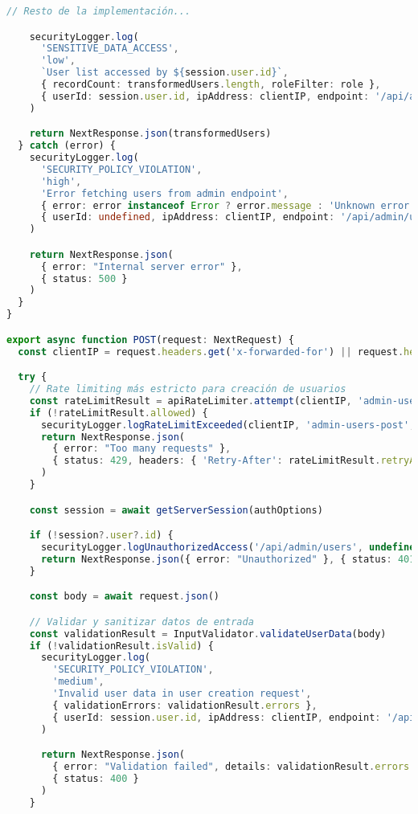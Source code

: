 \documentclass[12pt,a4paper]{article}
\begin{document}
\begin{lstlisting}[language=TypeScript, caption=API con Seguridad Integrada]
    // Resto de la implementación...

    securityLogger.log(
      'SENSITIVE_DATA_ACCESS',
      'low',
      `User list accessed by ${session.user.id}`,
      { recordCount: transformedUsers.length, roleFilter: role },
      { userId: session.user.id, ipAddress: clientIP, endpoint: '/api/admin/users' }
    )

    return NextResponse.json(transformedUsers)
  } catch (error) {
    securityLogger.log(
      'SECURITY_POLICY_VIOLATION',
      'high',
      'Error fetching users from admin endpoint',
      { error: error instanceof Error ? error.message : 'Unknown error' },
      { userId: undefined, ipAddress: clientIP, endpoint: '/api/admin/users' }
    )

    return NextResponse.json(
      { error: "Internal server error" },
      { status: 500 }
    )
  }
}

export async function POST(request: NextRequest) {
  const clientIP = request.headers.get('x-forwarded-for') || request.headers.get('x-real-ip') || 'unknown'

  try {
    // Rate limiting más estricto para creación de usuarios
    const rateLimitResult = apiRateLimiter.attempt(clientIP, 'admin-users-post')
    if (!rateLimitResult.allowed) {
      securityLogger.logRateLimitExceeded(clientIP, 'admin-users-post', clientIP)
      return NextResponse.json(
        { error: "Too many requests" },
        { status: 429, headers: { 'Retry-After': rateLimitResult.retryAfter?.toString() || '300' } }
      )
    }

    const session = await getServerSession(authOptions)

    if (!session?.user?.id) {
      securityLogger.logUnauthorizedAccess('/api/admin/users', undefined, clientIP)
      return NextResponse.json({ error: "Unauthorized" }, { status: 401 })
    }

    const body = await request.json()

    // Validar y sanitizar datos de entrada
    const validationResult = InputValidator.validateUserData(body)
    if (!validationResult.isValid) {
      securityLogger.log(
        'SECURITY_POLICY_VIOLATION',
        'medium',
        'Invalid user data in user creation request',
        { validationErrors: validationResult.errors },
        { userId: session.user.id, ipAddress: clientIP, endpoint: '/api/admin/users' }
      )

      return NextResponse.json(
        { error: "Validation failed", details: validationResult.errors },
        { status: 400 }
      )
    }


\end{lstlisting}
\end{document}
